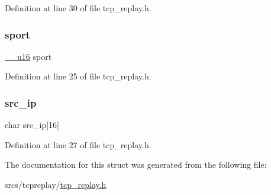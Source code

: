 Definition at line 30 of file tcp\+\_\+replay.\+h.

\mbox{\label{structsudo__packet__data_a5932845efeeab2e1c9720ebebe6bb87c}} 
\subsubsection{\texorpdfstring{sport}{sport}}
{\footnotesize\ttfamily \hyperlink{asm__types_8h_abc70358187152575fd05fbf6d253151f}{\+\_\+\+\_\+u16} sport}



Definition at line 25 of file tcp\+\_\+replay.\+h.

\mbox{\label{structsudo__packet__data_a6fd5d347f32793884e74b1b1588056e0}} 
\subsubsection{\texorpdfstring{src\+\_\+ip}{src\_ip}}
{\footnotesize\ttfamily char src\+\_\+ip\mbox{[}16\mbox{]}}



Definition at line 27 of file tcp\+\_\+replay.\+h.



The documentation for this struct was generated from the following file\+:\begin{DoxyCompactItemize}
\item 
srcs/tcpreplay/\hyperlink{tcp__replay_8h}{tcp\+\_\+replay.\+h}\end{DoxyCompactItemize}
